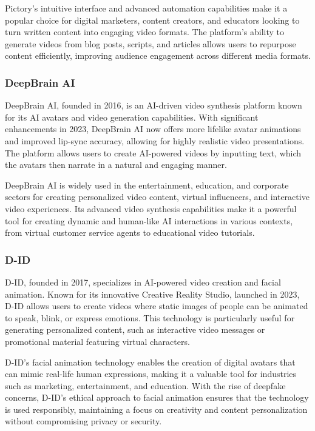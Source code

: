 Pictory’s intuitive interface and advanced automation capabilities make it a popular choice for digital marketers, content creators, and educators looking to turn written content into engaging video formats. 
The platform’s ability to generate videos from blog posts, scripts, and articles allows users to repurpose content efficiently, improving audience engagement across different media formats.

\subsubsection{DeepBrain AI}

DeepBrain AI, founded in 2016, is an AI-driven video synthesis platform known for its AI avatars and video generation capabilities. 
With significant enhancements in 2023, DeepBrain AI now offers more lifelike avatar animations and improved lip-sync accuracy, allowing for highly realistic video presentations. 
The platform allows users to create AI-powered videos by inputting text, which the avatars then narrate in a natural and engaging manner.

DeepBrain AI is widely used in the entertainment, education, and corporate sectors for creating personalized video content, virtual influencers, and interactive video experiences. 
Its advanced video synthesis capabilities make it a powerful tool for creating dynamic and human-like AI interactions in various contexts, from virtual customer service agents to educational video tutorials.

\subsubsection{D-ID}

D-ID, founded in 2017, specializes in AI-powered video creation and facial animation. 
Known for its innovative Creative Reality Studio, launched in 2023, D-ID allows users to create videos where static images of people can be animated to speak, blink, or express emotions. 
This technology is particularly useful for generating personalized content, such as interactive video messages or promotional material featuring virtual characters.

D-ID’s facial animation technology enables the creation of digital avatars that can mimic real-life human expressions, making it a valuable tool for industries such as marketing, entertainment, and education. 
With the rise of deepfake concerns, D-ID’s ethical approach to facial animation ensures that the technology is used responsibly, maintaining a focus on creativity and content personalization without compromising privacy or security.

